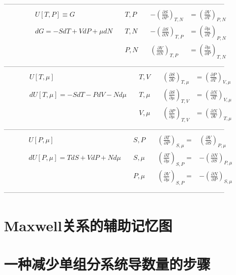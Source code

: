 ————————————————————————————————
\begin{align}
	& U[T, P] \equiv G \quad & T, P \quad & -\left( \frac{\partial S}{\partial P} \right)_{T, N} &= \left( \frac{\partial V}{\partial T} \right)_{P, N} \label{equ7.15} \\
	& dG = -SdT + VdP + \mu dN \quad & T, N \quad & -\left( \frac{\partial S}{\partial N} \right)_{T, P} &= \left( \frac{\partial \mu}{\partial T} \right)_{P, N} \label{equ7.16} \\
	& \phantom{dG = -SdT + VdP + \mu dN \quad} & P, N \quad & \left( \frac{\partial V}{\partial N} \right)_{T, P} &= \left( \frac{\partial \mu}{\partial P} \right)_{T, N} \label{equ7.17}
\end{align}
————————————————————————————————
\begin{align}
	& U[T, \mu] \quad & T, V \quad & \left( \frac{\partial S}{\partial V} \right)_{T, \mu} &= \left( \frac{\partial P}{\partial T} \right)_{V, \mu} \label{equ7.18} \\
	& dU[T, \mu] = -SdT - PdV - Nd\mu \quad & T, \mu \quad & \left( \frac{\partial S}{\partial \mu} \right)_{T, V} &= \left( \frac{\partial N}{\partial T} \right)_{V, \mu} \label{equ7.19} \\
	& \phantom{dU[T, \mu] = -SdT - PdV - Nd\mu \quad} & V, \mu \quad & \left( \frac{\partial P}{\partial \mu} \right)_{T, V} &= \left( \frac{\partial N}{\partial V} \right)_{T, \mu} \label{equ7.20}
\end{align}
————————————————————————————————
\begin{align}
	& U[P, \mu] \quad & S, P \quad & \left( \frac{\partial T}{\partial P} \right)_{S, \mu} =& \left( \frac{\partial V}{\partial S} \right)_{P, \mu} \label{equ7.21} \\
	& dU[P, \mu] = TdS + VdP + Nd\mu \quad & S, \mu \quad & \left( \frac{\partial T}{\partial \mu} \right)_{S, P} =& -\left( \frac{\partial N}{\partial S} \right)_{P, \mu} \label{equ7.22} \\
	& \phantom{ dU[P, \mu] = TdS + VdP + Nd\mu \quad} & P, \mu \quad & \left( \frac{\partial V}{\partial \mu} \right)_{S, P} =& -\left( \frac{\partial N}{\partial P} \right)_{S, \mu} \label{equ7.23}
\end{align}
————————————————————————————————

\section{Maxwell关系的辅助记忆图}
\label{sec7.2}

\section{一种减少单组分系统导数量的步骤}
\label{sec7.3}
